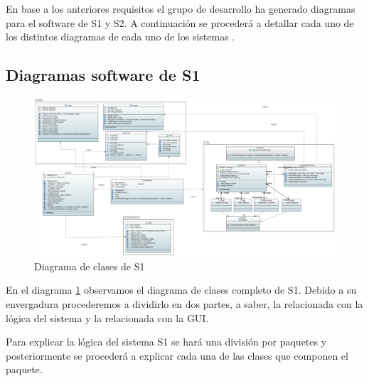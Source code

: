 En base a los anteriores requisitos el grupo de desarrollo ha generado diagramas para el software de \ac{S1} y \ac{S2}. A continuación se procederá a detallar cada uno de los distintos diagramas de cada uno de los sistemas . 


\subsection{Diagramas software de S1}

\begin{figure}[H]
    \centering
    \includegraphics[width=\linewidth]{pictures/S1ClassDiagram.PNG}
    \caption{Diagrama de clases de \ac{S1}}
    \label{fig:diagrama_clases_s1}
\end{figure}

En el diagrama \ref{fig:diagrama_clases_s1} observamos el diagrama de clases completo de \ac{S1}. Debido a su envergadura procederemos a dividirlo en dos partes, a saber, la relacionada con la lógica del sistema y la relacionada con la GUI.

Para explicar la lógica del sistema \ac{S1} se hará una división por paquetes y posteriormente se procederá a explicar cada una de las clases que componen el paquete.

